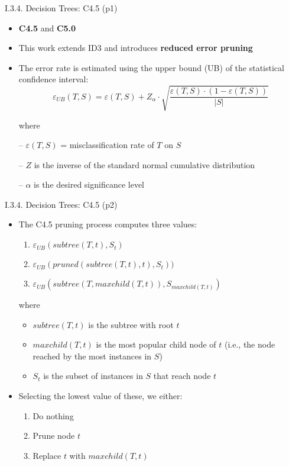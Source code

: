 \documentclass[handout]{beamer}
\newcommand{\strong}[1]{\textbf{\color{teal} #1}}
\newcommand{\stronger}[1]{\textbf{\color{purple} #1}}
\begin{document}
\begin{frame}{I.3.4. Decision Trees: C4.5 (p1)}
\begin{itemize}
\item \stronger{C4.5} and \stronger{C5.0}~\cite{quinlan-c4.5:1987,quinlan-c4.5:1996}
\item This work extends ID3 and introduces \strong{reduced error pruning}
\item The error rate is estimated using the upper bound (UB) of the statistical confidence interval:
\[
\varepsilon_{UB}(T,S) = \varepsilon(T,S) + Z_\alpha \cdot \sqrt{\frac{\varepsilon(T,S) \cdot ( 1 - \varepsilon(T,S) ) }{|S|}}
\]
\item[] where
\item[--] $\varepsilon(T,S)$ = misclassification rate of $T$ on $S$
\item[--] $Z$ is the inverse of the standard normal cumulative distribution
\item[--] $\alpha$ is the desired significance level
\end{itemize}
\end{frame}
\begin{frame}{I.3.4. Decision Trees: C4.5 (p2)}
\begin{itemize}
\item The C4.5 pruning process computes three values:
	\begin{enumerate}
	\item $\varepsilon_{UB}(subtree(T,t),S_t)$
	\item $\varepsilon_{UB}(pruned(subtree(T,t),t),S_t))$
	\item $\varepsilon_{UB}(subtree(T,maxchild(T,t)),S_{maxchild(T,t)})$
	\end{enumerate}
\item[] where
	\begin{itemize}
	\item $subtree(T,t)$ is the subtree with root $t$
	\item $maxchild(T,t)$ is the most popular child node of $t$ (i.e., the node reached by the most instances in $S$)
	\item $S_t$ is the subset of instances in $S$ that reach node $t$
	\end{itemize}
\item Selecting the lowest value of these, we either:
	\begin{enumerate}
	\item Do nothing
	\item Prune node $t$
	\item Replace $t$ with $maxchild(T,t)$
	\end{enumerate}
\end{itemize}
\end{frame}
\end{document}
